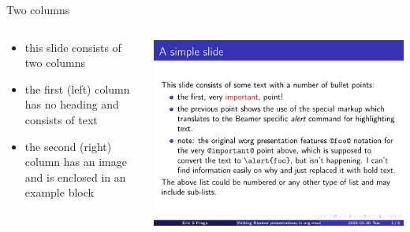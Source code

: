 \documentclass[bigger]{beamer}
\begin{document}
\begin{frame}[label={sec:org4210a3e}]{Two columns}
\begin{columns}
\begin{column}{0.4\columnwidth}
\begin{itemize}
\item this slide consists of two columns
\item the first (left) column has no heading and consists of text
\item the second (right) column has an image and is enclosed in an
\alert{example} block
\end{itemize}
\end{column}

\begin{column}{0.6\columnwidth}
\begin{example}[A screenshot]
\begin{center}
\includegraphics[width=.9\linewidth]{./img/a_simple_slide.png}
\end{center}
\end{example}
\end{column}
\end{columns}
\end{frame}
\end{document}
